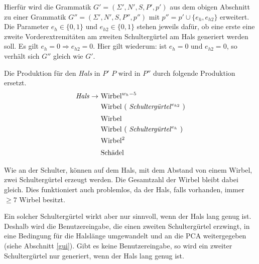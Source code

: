 Hierfür wird die Grammatik $G' = (\Sigma', N', S, P', p')$ aus dem obigen Abschnitt zu einer Grammatik \mbox{$G'' = (\Sigma', N', S, P'', p'')$} mit $p'' = p' \cup \{e_h, e_{h2}\}$ erweitert. Die Parameter $e_h \in \{0,1\}$ und $e_{h2} \in \{0, 1\}$ stehen jeweils dafür, ob eine erste \bzw eine zweite Vorderextremitäten am zweiten Schultergürtel am Hals generiert werden soll. Es gilt $e_h = 0 \Rightarrow e_{h2} = 0$. Hier gilt wiederum: ist $e_{h} = 0$ und $e_{h2} = 0$, so verhält sich $G''$ gleich wie $G'$.

Die Produktion für den \emph{Hals} in $P'$ \bzw $P$ wird in $P''$ durch folgende Produktion ersetzt.
\begin{align*}
 \text{\emph{Hals}} \rightarrow &\text{ Wirbel}^{w_h - 5}\\
    &\text{ Wirbel ( \emph{Schultergürtel}$^{e_{h2}}$ )}\\
    &\text{ Wirbel}^{\vphantom{(}}\\
    &\text{ Wirbel ( \emph{Schultergürtel}$^{e_h}$ )}\\
    &\text{ Wirbel$^2$}\\
    &\text{ Schädel}^{\vphantom{(}}
\end{align*}

Wie an der Schulter, können auf dem Hals, mit dem Abstand von einem Wirbel, zwei Schultergürtel erzeugt werden. Die Gesamtzahl der Wirbel bleibt dabei gleich.  Dies funktioniert auch problemlos, da der Hals, falls vorhanden, immer $\geq 7$ Wirbel besitzt.

Ein solcher Schultergürtel wirkt aber nur sinnvoll, wenn der Hals lang genug ist. Deshalb wird die Benutzereingabe, die einen zweiten Schultergürtel erzwingt, in eine Bedingung für die Halslänge umgewandelt und an die PCA weitergegeben (siehe Abschnitt \ref{gui}). Gibt es keine Benutzereingabe, so wird ein zweiter Schultergürtel nur generiert, wenn der Hals lang genug ist.

